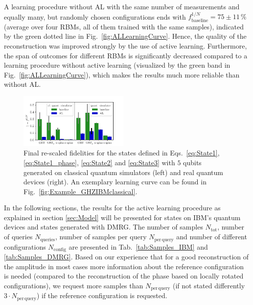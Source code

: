 \documentclass[pra,aps,showpacs,groupedaddress,superscriptaddress,twocolumn,toc=flat,biblatex,footinbib]{revtex4-1}
\begin{document}
A learning procedure without AL with the same number of measurements and equally many, but randomly chosen configurations ends with $f^{1/N}_{\mathrm{baseline}}=75\pm 11\,\%$ (average over four RBMs, all of them trained with the same samples), indicated by the green dotted line in Fig.~\ref{fig:ALLearningCurve}. Hence, the quality of the reconstruction was improved strongly by the use of active learning. Furthermore, the span of outcomes for different RBMs is significantly decreased compared to a learning procedure without active learning (visualized by the green band in Fig.~\ref{fig:ALLearningCurve}), which makes the results much more reliable than without AL. \\

\begin{figure}[t]
	\centering
  \includegraphics[width=0.48\textwidth]{Fig3.pdf}
	\caption[]{Final re-scaled fidelities for the states defined in Eqs.~\eqref{eq:State1}, \eqref{eq:State1_phase}, \eqref{eq:State2} and \eqref{eq:State3} with $5$ qubits generated on classical quantum simulators (left) and real quantum devices (right). An exemplary learning curve can be found in Fig.~\ref{fig:Example_GHZIBMclassical}.}
	\label{fig:IBM}
\end{figure}

In the following sections, the results for the active learning procedure as explained in section \ref{sec:Model} will be presented for states on IBM's quantum devices and states generated with DMRG. The number of samples $N_{\mathrm{tot}}$, number of queries $N_{\mathrm{queries}}$, number of samples per query $N_{\mathrm{per\,query}}$ and number of different configurations $N_{\mathrm{config}}$ are presented in Tab.~\ref{tab:Samples_IBM} and \ref{tab:Samples_DMRG}. Based on our experience that for a good reconstruction of the amplitude in most cases more information about the reference configuration is needed (compared to the reconstruction of the phase based on locally rotated configurations), we request more samples than $N_{\mathrm{per\,query}}$ (if not stated differently $3\cdot N_{\mathrm{per\,query}}$) if the reference configuration is requested.
\end{document}
